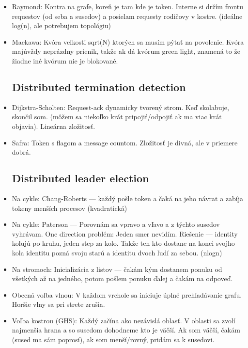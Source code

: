 \documentclass[paper=a4, fontsize=11pt]{scrartcl} %
\numberwithin{equation}{section} %
\numberwithin{figure}{section} %
\numberwithin{table}{section} %
\begin{document}
\begin{itemize}
	\item Raymond: Kontra na grafe, koreň je tam kde je token. Interne si držím frontu requestov (od seba a susedov) a posielam requesty rodičovy v kostre. (ideálne log(n), ale potrebujem topológiu)
	
	\item Maekawa: Kvóra veľkosti sqrt(N) ktorých sa musím pýtať na povolenie. Kvóra majúvždy neprázdny prienik, takže ak dá kvórum green light, znamená to že žiadne iné kvórum nie je blokované.
	
	\subsection{Distributed termination detection}
	
	\item Dijkstra-Scholten: Request-ack dynamicky tvorený strom. Keď skolabuje, skončil som. (môžem sa niekoľko krát pripojiť/odpojiť ak ma viac krát objavia). Lineárna zložitosť.
	
	\item Safra: Token s flagom a message countom. Zložitosť je divná, ale v priemere dobrá.
	
	\subsection{Distributed leader election}
	
	\item Na cykle: Chang-Roberts — každý pošle token a čaká na jeho návrat a zabíja tokeny menších procesov (kvadratická)
	\item Na cykle: Paterson — Porovnám sa vpravo a vľavo a z týchto susedov vyhrávam. One direction problém: Jeden smer nevidím. Riešenie — identity kolujú po kruhu, jeden step za kolo. Takže ten kto dostane na konci svojho kola identitu pozná svoju starú a identitu dvoch ľudí za sebou. (nlogn)
	
	\item Na stromoch: Inicializácia z listov — čakám kým dostanem ponuku od všetkých až na jedného, potom pošlem ponuku ďalej a čakám na odpoveď.
	
	\item Obecná voľba vlnou: V každom vrchole sa iniciuje úplné prehľadávanie grafu. Horšie vlny sa pri strete zrušia. 
	
	\item Voľba kostrou (GHS): Každý začína ako nezávislá oblasť. V oblasti sa zvolí najmenšia hrana a so susedom dohodneme kto je väčší. Ak som väčší, čakám (sused ma sám poprosí), ak som menší/rovný, pridám sa k susedovi. 
	

\end{itemize}
\end{document}
